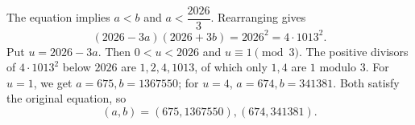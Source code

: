 The equation implies $a<b$ and $a<\dfrac{2026}{3}$. Rearranging gives
\[
(2026-3a)(2026+3b)=2026^2=4\cdot1013^2.
\]
Put $u=2026-3a$. Then $0<u<2026$ and $u\equiv1\pmod3$. The positive divisors of $4\cdot1013^2$ below $2026$ are $1,2,4,1013$, of which only $1,4$ are $1$ modulo $3$.
For $u=1$, we get $a=675,b=1367550$; for $u=4$, $a=674,b=341381$. Both satisfy the original equation, so
\[
\boxed{(a,b)=(675,1367550),(674,341381)}.
\]
